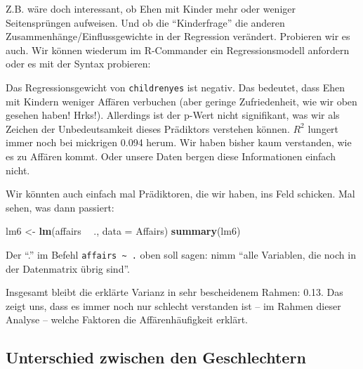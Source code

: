 \documentclass[12pt,ngerman,]{book}
\makeatletter
\newenvironment{Shaded}{\begin{snugshade}}{\end{snugshade}}
\newcommand{\KeywordTok}[1]{\textcolor[rgb]{0.13,0.29,0.53}{\textbf{#1}}}
\newcommand{\DataTypeTok}[1]{\textcolor[rgb]{0.13,0.29,0.53}{#1}}
\newcommand{\StringTok}[1]{\textcolor[rgb]{0.31,0.60,0.02}{#1}}
\newcommand{\OperatorTok}[1]{\textcolor[rgb]{0.81,0.36,0.00}{\textbf{#1}}}
\newcommand{\NormalTok}[1]{#1}
\newenvironment{kframe}{%
\medskip{}
\setlength{\fboxsep}{.8em}
 \def\at@end@of@kframe{}%
 \ifinner\ifhmode%
  \def\at@end@of@kframe{\end{minipage}}%
  \begin{minipage}{\columnwidth}%
 \fi\fi%
 \def\FrameCommand##1{\hskip\@totalleftmargin \hskip-\fboxsep
 \colorbox{shadecolor}{##1}\hskip-\fboxsep
     \hskip-\linewidth \hskip-\@totalleftmargin \hskip\columnwidth}%
 \MakeFramed {\advance\hsize-\width
   \@totalleftmargin\z@ \linewidth\hsize
   \@setminipage}}%
 {\par\unskip\endMakeFramed%
 \at@end@of@kframe}
\renewenvironment{Shaded}{\begin{kframe}}{\end{kframe}}
\theoremstyle{definition}
\theoremstyle{definition}
\theoremstyle{remark}
\makeatother
\begin{document}
Z.B. wäre doch interessant, ob Ehen mit Kinder mehr oder weniger
Seitensprüngen aufweisen. Und ob die ``Kinderfrage'' die anderen
Zusammenhänge/Einflussgewichte in der Regression verändert. Probieren
wir es auch. Wir können wiederum im R-Commander ein Regressionsmodell
anfordern oder es mit der Syntax probieren:

\begin{Shaded}
\end{Shaded}

Das Regressionsgewicht von \texttt{childrenyes} ist negativ. Das
bedeutet, dass Ehen mit Kindern weniger Affären verbuchen (aber geringe
Zufriedenheit, wie wir oben gesehen haben! Hrks!). Allerdings ist der
p-Wert nicht signifikant, was wir als Zeichen der Unbedeutsamkeit dieses
Prädiktors verstehen können. \(R^2\) lungert immer noch bei mickrigen
0.094 herum. Wir haben bisher kaum verstanden, wie es zu Affären kommt.
Oder unsere Daten bergen diese Informationen einfach nicht.

Wir könnten auch einfach mal Prädiktoren, die wir haben, ins Feld
schicken. Mal sehen, was dann passiert:

\begin{Shaded}
\begin{Highlighting}[]
\NormalTok{lm6 <-}\StringTok{ }\KeywordTok{lm}\NormalTok{(affairs }\OperatorTok{~}\StringTok{ }\NormalTok{., }\DataTypeTok{data =}\NormalTok{ Affairs)}
\KeywordTok{summary}\NormalTok{(lm6)}
\end{Highlighting}
\end{Shaded}

Der ``.'' im Befehl \texttt{affairs\ \textasciitilde{}\ .} oben soll
sagen: nimm ``alle Variablen, die noch in der Datenmatrix übrig sind''.

Insgesamt bleibt die erklärte Varianz in sehr bescheidenem Rahmen: 0.13.
Das zeigt uns, dass es immer noch nur schlecht verstanden ist -- im
Rahmen dieser Analyse -- welche Faktoren die Affärenhäufigkeit erklärt.

\subsection{Unterschied zwischen den
Geschlechtern}\label{unterschied-zwischen-den-geschlechtern}
\end{document}
